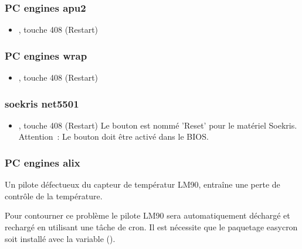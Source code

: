 \subsubsection{PC engines apu2}
\begin{itemize}
  \item {}, touche 408 (Restart)
\end{itemize}

\subsubsection{PC engines wrap}
\begin{itemize}
  \item {}, touche 408 (Restart)
\end{itemize}

\subsubsection{soekris net5501}
\begin{itemize}
  \item {}, touche 408 (Restart)
  \newline Le bouton est nommé 'Reset' pour le matériel Soekris.
  \newline Attention~: Le bouton doit être activé dans le BIOS.
\end{itemize}


\subsubsection{PC engines alix}
Un pilote défectueux du capteur de températur LM90, entraîne une perte de contrôle
de la température.

Pour contourner ce problème le pilote LM90 sera automatiquement déchargé et rechargé
en utilisant une tâche de cron. Il est nécessite que le paquetage easycron soit
installé avec la variable ().


